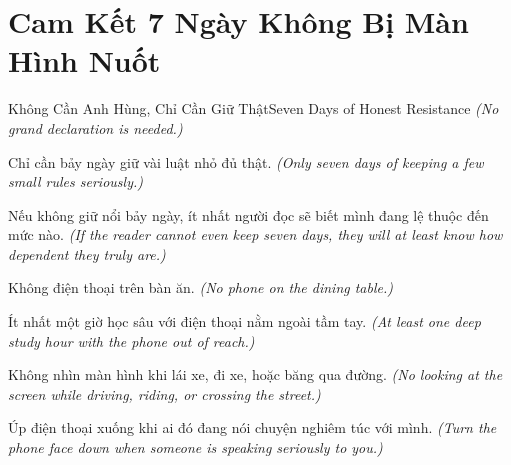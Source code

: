 \chapter*{Cam Kết 7 Ngày Không Bị Màn Hình Nuốt}

\begin{truyen}{Không Cần Anh Hùng, Chỉ Cần Giữ Thật}{Seven Days of Honest Resistance}
\textit{(No grand declaration is needed.)}

Chỉ cần bảy ngày giữ vài luật nhỏ đủ thật.
\textit{(Only seven days of keeping a few small rules seriously.)}

Nếu không giữ nổi bảy ngày, ít nhất người đọc sẽ biết mình đang lệ thuộc đến mức nào.
\textit{(If the reader cannot even keep seven days, they will at least know how dependent they truly are.)}
\end{truyen}

\begin{tcolorbox}[colback=white,colframe=bookprimary!60,arc=4pt,boxrule=0.8pt,title={Ngày 1. Bàn Ăn},fonttitle=\bfseries]
Không điện thoại trên bàn ăn.
\textit{(No phone on the dining table.)}
\end{tcolorbox}

\begin{tcolorbox}[colback=white,colframe=bookprimary!60,arc=4pt,boxrule=0.8pt,title={Ngày 2. Giờ Học},fonttitle=\bfseries]
Ít nhất một giờ học sâu với điện thoại nằm ngoài tầm tay.
\textit{(At least one deep study hour with the phone out of reach.)}
\end{tcolorbox}

\begin{tcolorbox}[colback=white,colframe=bookprimary!60,arc=4pt,boxrule=0.8pt,title={Ngày 3. Đường Đi},fonttitle=\bfseries]
Không nhìn màn hình khi lái xe, đi xe, hoặc băng qua đường.
\textit{(No looking at the screen while driving, riding, or crossing the street.)}
\end{tcolorbox}

\begin{tcolorbox}[colback=white,colframe=bookprimary!60,arc=4pt,boxrule=0.8pt,title={Ngày 4. Cuộc Nói Chuyện},fonttitle=\bfseries]
Úp điện thoại xuống khi ai đó đang nói chuyện nghiêm túc với mình.
\textit{(Turn the phone face down when someone is speaking seriously to you.)}
\end{tcolorbox}

